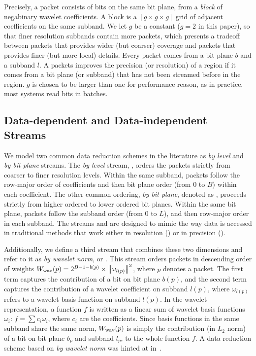 Precisely, a packet consists of bits on the same bit plane, from a \emph{block} of negabinary
wavelet coefficients. A block is a $[g\times g\times g]$ grid of adjacent coefficients on the same
subband. We let $g$ be a constant ($g=2$ in this paper), so that finer resolution subbands contain
more packets, which presents a tradeoff between packets that provides wider (but coarser) coverage
and packets that provides finer (but more local) details. Every packet comes from a bit plane $b$
and a subband $l$. A packets improves the precision (or resolution) of a region if it comes from a
bit plane (or subband) that has not been streamed before in the region. $g$ is chosen to be larger
than one for performance reason, as in practice, most systems read bits in batches.

\subsection{Data-dependent and Data-independent Streams} \label{sec:static-dynamic-streams}

We model two common data reduction schemes in the literature as \emph{by level} and \emph{by bit
plane} streams. The \emph{by level} stream, \slvl, orders the packets strictly from coarser to finer
resolution levels. Within the same subband, packets follow the row-major order of coefficients and
then bit plane order (from 0 to $B$) within each coefficient. The other common ordering, \emph{by
bit plane}, denoted as \sbit, proceeds strictly from higher ordered to lower ordered bit planes.
Within the same bit plane, packets follow the subband order (from 0 to $L$), and then row-major
order in each subband. The streams \slvl and \sbit are designed to mimic the way data is accessed in
traditional methods that work either in resolution (\slvl) or in precision (\sbit).

Additionally, we define a third stream that combines these two dimensions and refer to it as
\emph{by wavelet norm}, or \swav. This stream orders packets in descending order of weights
$\wwav(p)=2^{B-1-b(p)}\times \norm{\omega_{l(p)}}^2$, where $p$ denotes a packet. The first term
captures the contribution of a bit on bit plane $b(p)$, and the second term captures the
contribution of a wavelet coefficient on subband $l(p)$, where $\omega_{l(p)}$ refers to a wavelet
basis function on subband $l(p)$. In the wavelet representation, a function $f$ is written as a
linear sum of wavelet basis functions $\omega_i$: $f=\sum{c_i\omega_i}$, where $c_i$ are the
coefficients. Since basis functions in the same subband share the same norm, $\wwav(p)$ is simply
the contribution (in $L_2$ norm) of a bit on bit plane $b_p$ and subband $l_p$, to the whole
function $f$. A data-reduction scheme based on \emph{by wavelet norm} was hinted at in~\cite{weiss}.


